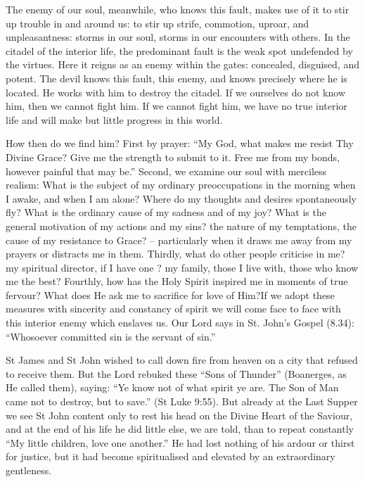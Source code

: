 The enemy of our soul, meanwhile, who knows this fault, makes use of it to stir up trouble in and around us: to stir up strife, commotion, uproar, and unpleasantness: storms in our soul, storms in our encounters with others. In the citadel of the interior life, the predominant fault is the weak spot undefended by the virtues. Here it reigns as an enemy within the gates: concealed, disguised, and potent. The devil knows this fault, this enemy, and knows precisely where he is located. He works with him to destroy the citadel. If we ourselves do not know him, then we cannot fight him. If we cannot fight him, we have no true interior life and will make but little progress in this world.

How then do we find him? First by prayer: ``My God, what makes me resist Thy Divine Grace? Give me the strength to submit to it. Free me from my bonds, however painful that may be.'' Second, we examine our soul with merciless realism: What is the subject of my ordinary preoccupations in the morning when I awake, and when I am alone? Where do my thoughts and desires spontaneously fly? What is the ordinary cause of my sadness and of my joy? What is the general motivation of my actions and my sins? the nature of my temptations, the cause of my resistance to Grace? – particularly when it draws me away from my prayers or distracts me in them. Thirdly, what do other people criticise in me? my spiritual director, if I have one ? my family, those I live with, those who know me the best? Fourthly, how has the Holy Spirit inspired me in moments of true fervour? What does He ask me to sacrifice for love of Him?If we adopt these measures with sincerity and constancy of spirit we will come face to face with this interior enemy which enslaves us. Our Lord says in St. John's Gospel (8.34): ``Whosoever committed sin is the servant of sin.'' 

St James and St John wished to call down fire from heaven on a city that refused to receive them. But the Lord rebuked these ``Sons of Thunder'' (Boanerges, as He called them), saying: ``Ye know not of what spirit ye are. The Son of Man came not to destroy, but to save.'' (St Luke 9:55). But already at the Last Supper we see St John content only to rest his head on the Divine Heart of the Saviour, and at the end of his life he did little else, we are told, than to repeat constantly ``My little children, love one another.'' He had lost nothing of his ardour or thirst for justice, but it had become spiritualised and elevated by an extraordinary gentleness. 

